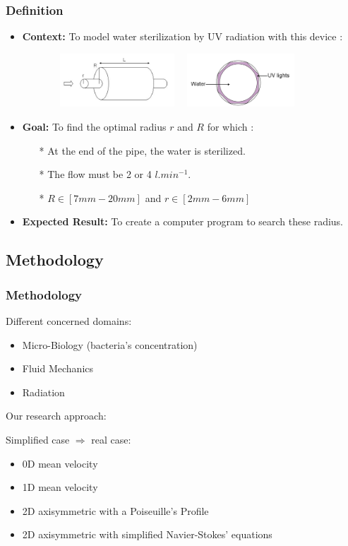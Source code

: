 \documentclass[xcolor=dvipsnames,10pt]{beamer}
\begin{document}
\begin{frame}
	\frametitle{Definition}
\begin{itemize}[<+->]
\item \textbf{Context:} To model water sterilization by UV radiation with this device :
	\begin{figure}
		\raggedleft
		\includegraphics[width=5cm,height=2cm]{./images/sterilisateurh.jpg}
		\hspace{3mm}
		\raggedright
		\includegraphics[width=4cm,height=2cm]{./images/coupeSterilisateur.jpg}
	\end{figure}
\item \textbf{Goal:} To find the optimal radius $r$ and $R$ for which :
	\begin{itemize} 
		\item[*] At the end of the pipe, the water is sterilized.
		\item[*] The flow must be 2 or 4 $l.min^{-1}$.
		\item[*] $R \in [7mm - 20mm]$ and $r \in [2mm - 6mm]$
	\end{itemize}
\item \textbf{Expected Result:} To create a computer program to search these radius.
\end{itemize}
\end{frame}

\subsection{Methodology}

\begin{frame}
	\frametitle{Methodology}
\begin{block}{Different concerned domains:}
\begin{itemize}[<+->]
\item Micro-Biology (bacteria's concentration)
\item Fluid Mechanics
\item Radiation
\end{itemize}
\end{block}
\pause
{} {Our research approach: }
\begin{block}{Simplified case $\Rightarrow$ real case:}
\begin{itemize}[<+->]
\item 0D mean velocity
\item 1D mean velocity
\item 2D axisymmetric with a Poiseuille's Profile
\item 2D axisymmetric with simplified Navier-Stokes' equations
\end{itemize}
\end{block}
\end{frame}
\end{document}
